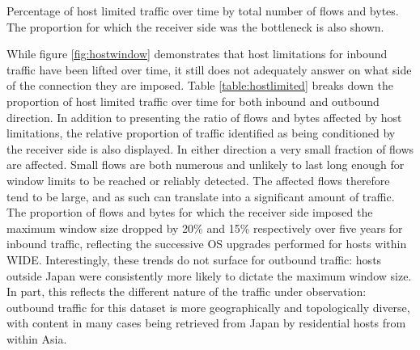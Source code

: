 \begin{table}\footnotesize
\centering
  \caption[Percentage of host limited traffic over time.]{\label{table:hostlimited}Percentage of host limited traffic over time by total number of flows and bytes. The proportion for which the receiver side was the bottleneck is also shown.}
\end{table}

While figure \ref{fig:hostwindow} demonstrates that host limitations for inbound traffic have been lifted over time, it still does not adequately answer on what side of the connection they are imposed.
Table \ref{table:hostlimited} breaks down the proportion of host limited traffic over time for both inbound and outbound direction.
In addition to presenting the ratio of flows and bytes affected by host limitations, the relative proportion of traffic identified as being conditioned by the receiver side is also displayed.
In either direction a very small fraction of flows are affected.
Small flows are both numerous and unlikely to last long enough for window limits to be reached or reliably detected.
The affected flows therefore tend to be large, and as such can translate into a significant amount of traffic.
The proportion of flows and bytes for which the receiver side imposed the maximum window size dropped by 20\% and 15\% respectively over five years for inbound traffic, reflecting the successive \acs{OS} upgrades performed for hosts within \acs{WIDE}.
Interestingly, these trends do not surface for outbound traffic: hosts outside Japan were consistently more likely to dictate the maximum window size.
In part, this reflects the different nature of the traffic under observation: outbound traffic for this dataset is more geographically and topologically diverse, with content in many cases being retrieved from Japan by residential hosts from within Asia.

